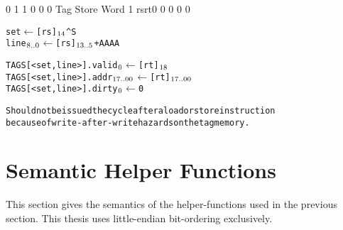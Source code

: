      {0 1 1 0 0 0} {Tag Store Word} {1} {\RawTag} {rs}{rt}{0 0 0 0 0}
\begin{alltt}
         set \hspace{1mm}   \(\leftarrow\) [rs]\({\sb{14}}\) ^ S
         line\({\sb{8..0}}\) \(\leftarrow\) [rs]\({\sb{13..5}}\) + AAAA

         TAGS[<set,line>].valid\({\sb{0}}\)     \(\leftarrow\) [rt]\({\sb{18}}\)
         TAGS[<set,line>].addr\({\sb{17..00}}\) \hspace{1.5mm} \(\leftarrow\) [rt]\({\sb{17..00}}\)
         TAGS[<set,line>].dirty\({\sb{0}}\)     \(\leftarrow\) 0

         Should not be issued the cycle after a load or store instruction
         because of write-after-write hazards on the tag memory.
\end{alltt}\rawInstrEnd
\rawInstrListEnd

\newpage
\section{Semantic Helper Functions}
\label{sec:semantic-helper-functions}
This section gives the semantics of the helper-functions used in the previous section. This
thesis uses little-endian bit-ordering exclusively.

